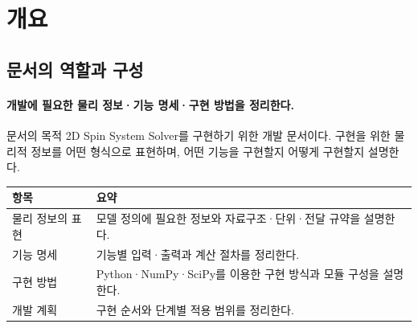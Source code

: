 
\section{개요}



\subsection{문서의 역할과 구성}\label{document-purpose}
\begingroup%
  \framesubtitle{개발에 필요한 물리 정보·기능 명세·구현 방법을 정리한다.}
  \begin{block}{문서의 목적}
    2D Spin System Solver를 구현하기 위한 개발 문서이다.
    구현을 위한 물리적 정보를 어떤 형식으로 표현하며, 어떤 기능을 구현할지 어떻게 구현할지 설명한다.
  \end{block}
  \par\medskip
  \begin{tabularx}{\textwidth}{@{}p{2.8cm}Y@{}}
    \toprule
    항목 & 요약 \\
    \midrule
    물리 정보의 표현 & 모델 정의에 필요한 정보와 자료구조·단위·전달 규약을 설명한다. \\
    기능 명세 & 기능별 입력·출력과 계산 절차를 정리한다. \\
    구현 방법 & Python·NumPy·SciPy를 이용한 구현 방식과 모듈 구성을 설명한다. \\
    개발 계획 & 구현 순서와 단계별 적용 범위를 정리한다. \\
    \bottomrule
  \end{tabularx}
  \par\medskip
\endgroup


